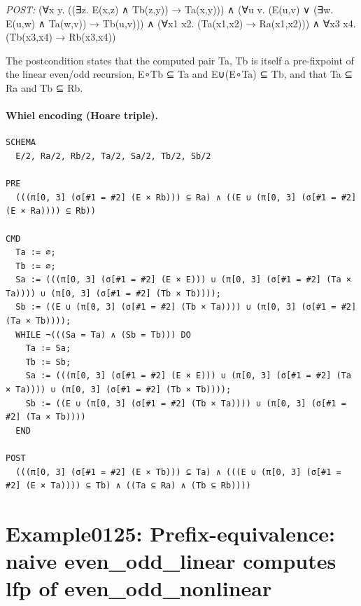 \documentclass[10pt]{article}
\begin{document}
\textit{POST:} (∀x y. ((∃z. E(x,z) ∧ Tb(z,y)) → Ta(x,y))) ∧ (∀u v. (E(u,v) ∨ (∃w. E(u,w) ∧ Ta(w,v)) → Tb(u,v))) ∧ (∀x1 x2. (Ta(x1,x2) → Ra(x1,x2))) ∧ ∀x3 x4. (Tb(x3,x4) → Rb(x3,x4))\par The postcondition states that the computed pair Ta, Tb is itself a pre-fixpoint of the linear even/odd recursion, E∘Tb ⊆ Ta and E∪(E∘Ta) ⊆ Tb, and that Ta ⊆ Ra and Tb ⊆ Rb.

\paragraph{Whiel encoding (Hoare triple).}

\begin{Verbatim}[fontsize=\scriptsize,breaklines=true,breakanywhere=true,frame=single,framesep=1.5mm]
SCHEMA
  E/2, Ra/2, Rb/2, Ta/2, Sa/2, Tb/2, Sb/2

PRE
  (((π[0, 3] (σ[#1 = #2] (E × Rb))) ⊆ Ra) ∧ ((E ∪ (π[0, 3] (σ[#1 = #2] (E × Ra)))) ⊆ Rb))

CMD
  Ta := ∅;
  Tb := ∅;
  Sa := (((π[0, 3] (σ[#1 = #2] (E × E))) ∪ (π[0, 3] (σ[#1 = #2] (Ta × Ta)))) ∪ (π[0, 3] (σ[#1 = #2] (Tb × Tb))));
  Sb := ((E ∪ (π[0, 3] (σ[#1 = #2] (Tb × Ta)))) ∪ (π[0, 3] (σ[#1 = #2] (Ta × Tb))));
  WHILE ¬(((Sa = Ta) ∧ (Sb = Tb))) DO
    Ta := Sa;
    Tb := Sb;
    Sa := (((π[0, 3] (σ[#1 = #2] (E × E))) ∪ (π[0, 3] (σ[#1 = #2] (Ta × Ta)))) ∪ (π[0, 3] (σ[#1 = #2] (Tb × Tb))));
    Sb := ((E ∪ (π[0, 3] (σ[#1 = #2] (Tb × Ta)))) ∪ (π[0, 3] (σ[#1 = #2] (Ta × Tb))))
  END

POST
  (((π[0, 3] (σ[#1 = #2] (E × Tb))) ⊆ Ta) ∧ (((E ∪ (π[0, 3] (σ[#1 = #2] (E × Ta)))) ⊆ Tb) ∧ ((Ta ⊆ Ra) ∧ (Tb ⊆ Rb))))
\end{Verbatim}

\Needspace{0.45\textheight}

\section{Example0125: Prefix-equivalence: naive even\_odd\_linear computes lfp of even\_odd\_nonlinear}\label{case:Example0125}
\end{document}
